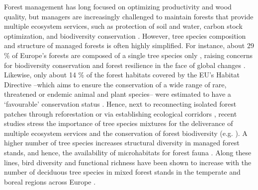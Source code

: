 \documentclass[10pt, twoside]{book} %
\begin{document}
Forest management has long focused on optimizing productivity and wood quality, but managers are increasingly challenged to maintain forests that provide multiple ecosystem services, such as protection of soil and water, carbon stock optimization, and biodiversity conservation \citep{Pawson2013, Puettmann2015}. However, tree species composition and structure of managed forests is often highly simplified. For instance, about 29 \% of Europe's forests are composed of a single tree species only \citep{Barsoum2016}, raising concerns for biodiversity conservation and forest resilience in the face of global changes \citep{Thompson2009}. Likewise, only about 14 \% of the forest habitats covered by the EU's Habitat Directive --which aims to ensure the conservation of a wide range of rare, threatened or endemic animal and plant species-- were estimated to have a `favourable' conservation status \citep{EEA2020}. Hence, next to reconnecting isolated forest patches through reforestation or via establishing ecological corridors \citep{Humphrey2015, Newmark2017}, recent studies stress the importance of tree species mixtures for the deliverance of multiple ecosystem services and the conservation of forest biodiversity (e.g. \citealt{Brockerhoff2017, VanderPlas2016, Hertzog2019}). A higher number of tree species increases structural diversity in managed forest stands, and hence, the availability of microhabitats for forest fauna \citep{Brockerhoff2017, Penone2019}. Along these lines, bird diversity and functional richness have been shown to increase with the number of deciduous tree species in mixed forest stands in the temperate and boreal regions across Europe \citep{Charbonnier2016}.\\
\end{document}
